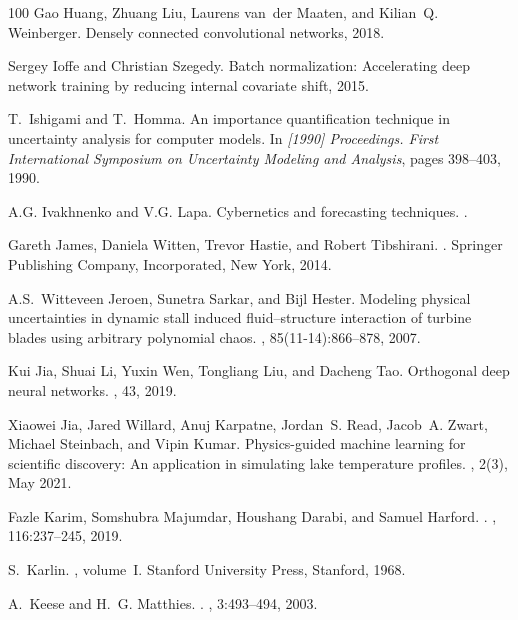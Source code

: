 \documentclass[a4paper,fleqn]{article}
\begin{document}
\begin{thebibliography}{100}
Gao Huang, Zhuang Liu, Laurens van~der Maaten, and Kilian~Q. Weinberger.
\newblock Densely connected convolutional networks, 2018.

Sergey Ioffe and Christian Szegedy.
\newblock Batch normalization: Accelerating deep network training by reducing
  internal covariate shift, 2015.

T.~Ishigami and T.~Homma.
\newblock An importance quantification technique in uncertainty analysis for
  computer models.
\newblock In {\em [1990] Proceedings. First International Symposium on
  Uncertainty Modeling and Analysis}, pages 398--403, 1990.

A.G. Ivakhnenko and V.G. Lapa.
\newblock Cybernetics and forecasting techniques.
.

Gareth James, Daniela Witten, Trevor Hastie, and Robert Tibshirani.
.
\newblock Springer Publishing Company, Incorporated, New York, 2014.

A.S.~Witteveen Jeroen, Sunetra Sarkar, and Bijl Hester.
\newblock Modeling physical uncertainties in dynamic stall induced
  fluid–structure interaction of turbine blades using arbitrary polynomial
  chaos.
, 85(11-14):866--878, 2007.

Kui Jia, Shuai Li, Yuxin Wen, Tongliang Liu, and Dacheng Tao.
\newblock Orthogonal deep neural networks.
,
  43, 2019.

Xiaowei Jia, Jared Willard, Anuj Karpatne, Jordan~S. Read, Jacob~A. Zwart,
  Michael Steinbach, and Vipin Kumar.
\newblock Physics-guided machine learning for scientific discovery: An
  application in simulating lake temperature profiles.
, 2(3), May 2021.

Fazle Karim, Somshubra Majumdar, Houshang Darabi, and Samuel Harford.
.
, 116:237--245, 2019.

S.~Karlin.
, volume~I.
\newblock Stanford University Press, Stanford, 1968.

A.~Keese and H.~G. Matthies.
.
, 3:493--494, 2003.


\end{thebibliography}
\end{document}
